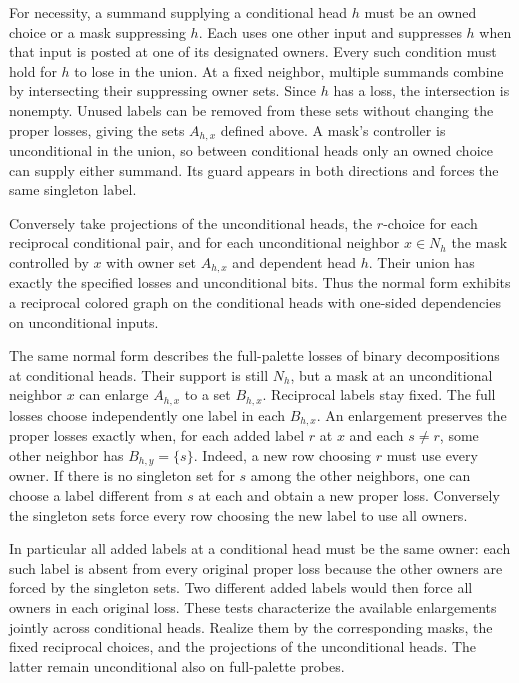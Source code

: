 For necessity, a summand supplying a
conditional head $h$ must be an owned
choice or a mask suppressing $h$. Each
uses one other input and suppresses $h$
when that input is posted at one of its
designated owners. Every such condition
must hold for $h$ to lose in the union.
At a fixed neighbor, multiple summands
combine by intersecting their suppressing
owner sets. Since $h$ has a loss, the
intersection is nonempty. Unused labels
can be removed from these sets without
changing the proper losses, giving the
sets $A_{h,x}$ defined above. A mask's
controller is unconditional in the union,
so between conditional heads only an
owned choice can supply either summand.
Its guard appears in both directions
and forces the same singleton label.

Conversely take projections of the
unconditional heads, the $r$-choice
for each reciprocal conditional pair,
and for each unconditional neighbor
$x\in N_h$ the mask controlled by $x$
with owner set $A_{h,x}$ and dependent
head $h$. Their union has exactly the
specified losses and unconditional bits.
Thus the normal form exhibits a
reciprocal colored graph on the
conditional heads with one-sided
dependencies on unconditional inputs.

The same normal form describes the full-palette
losses of binary decompositions at conditional
heads. Their support is still $N_h$, but a
mask at an unconditional neighbor $x$ can
enlarge $A_{h,x}$ to a set $B_{h,x}$.
Reciprocal labels stay fixed. The full
losses choose independently one label in
each $B_{h,x}$. An enlargement preserves
the proper losses exactly when, for each
added label $r$ at $x$ and each $s\ne r$,
some other neighbor has $B_{h,y}=\{s\}$.
Indeed, a new row choosing $r$ must use
every owner. If there is no singleton
set for $s$ among the other neighbors,
one can choose a label different from
$s$ at each and obtain a new proper loss.
Conversely the singleton sets force every
row choosing the new label to use all
owners.

In particular all added labels at a
conditional head must be the same owner:
each such label is absent from every
original proper loss because the other
owners are forced by the singleton sets.
Two different added labels would then
force all owners in each original loss.
These tests characterize the available
enlargements jointly across conditional
heads. Realize them by the corresponding
masks, the fixed reciprocal choices, and
the projections of the unconditional
heads. The latter remain unconditional
also on full-palette probes.

